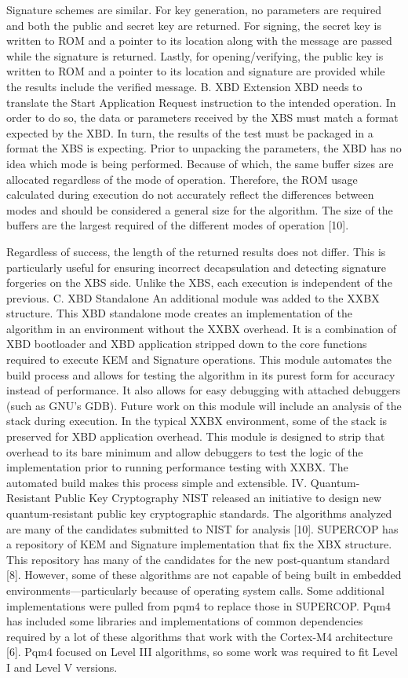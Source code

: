 Signature schemes are similar. For key generation, no parameters are required and both the public and secret key are returned. For signing, the secret key is written to ROM and a pointer to its location along with the message are passed while the signature is returned. Lastly, for opening/verifying, the public key is written to ROM and a pointer to its location and signature are provided while the results include the verified message.
B. XBD Extension
XBD needs to translate the Start Application Request instruction to the intended operation. In order to do so, the data or parameters received by the XBS must match a format expected by the XBD. In turn, the results of the test must be packaged in a format the XBS is expecting.
Prior to unpacking the parameters, the XBD has no idea which mode is being performed. Because of which, the same buffer sizes are allocated regardless of the mode of operation. Therefore, the ROM usage calculated during execution do not accurately reflect the differences between modes and should be considered a general size for the algorithm. 
The size of the buffers are the largest required of the different modes of operation [10].

Regardless of success, the length of the returned results does not differ. This is particularly useful for ensuring incorrect decapsulation and detecting signature forgeries on the XBS side.
Unlike the XBS, each execution is independent of the previous.
C. XBD Standalone
An additional module was added to the XXBX structure. This XBD standalone mode creates an implementation of the algorithm in an environment without the XXBX overhead. It is a combination of XBD bootloader and XBD application stripped down to the core functions required to execute KEM and Signature operations.
This module automates the build process and allows for testing the algorithm in its purest form for accuracy instead of performance. It also allows for easy debugging with attached debuggers (such as GNU’s GDB).
Future work on this module will include an analysis of the stack during execution. In the typical XXBX environment, some of the stack is preserved for XBD application overhead. This module is designed to strip that overhead to its bare minimum and allow debuggers to test the logic of the implementation prior to running performance testing with XXBX. The automated build makes this process simple and extensible.
IV. Quantum-Resistant Public Key Cryptography
NIST released an initiative to design new quantum-resistant public key cryptographic standards. The algorithms analyzed are many of the candidates submitted to NIST for analysis [10].
SUPERCOP has a repository of KEM and Signature implementation that fix the XBX structure. This repository has many of the candidates for the new post-quantum standard [8]. However, some of these algorithms are not capable of being built in embedded environments—particularly because of operating system calls.
Some additional implementations were pulled from pqm4 to replace those in SUPERCOP. Pqm4 has included some libraries and implementations of common dependencies required by a lot of these algorithms that work with the Cortex-M4 architecture [6]. Pqm4 focused on Level III algorithms, so some work was required to fit Level I and Level V versions. 

